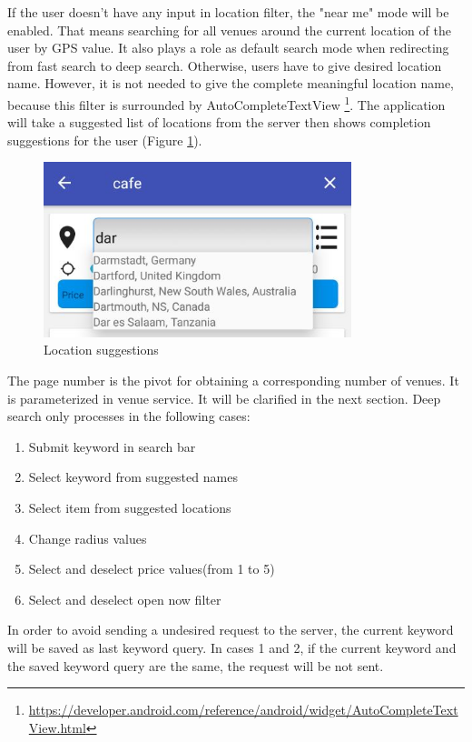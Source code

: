 If the user doesn't have any input in location filter, the "near me" mode will be enabled. That means searching for all venues around the current location of the user by GPS value. It also plays a role as default search mode when redirecting from fast search to deep search. Otherwise, users have to give desired location name. However, it is not needed to give the complete meaningful location name, because this filter is surrounded by AutoCompleteTextView \footnote{\url{https://developer.android.com/reference/android/widget/AutoCompleteTextView.html}}. The application will take a suggested list of locations from the server then shows completion suggestions for the user (Figure \ref{fig:locationSuggestions}).
\begin{figure}[htbp]
	\includegraphics[width=0.8\textwidth]{images/suggestedlocations.jpg}
	\centering
	\caption{Location suggestions}\label{fig:locationSuggestions}
\end{figure}
The page number is the pivot for obtaining a corresponding number of venues. It is parameterized in venue service. It will be clarified in the next section.
Deep search only processes in the following cases:
\begin{enumerate}
	\item Submit keyword in search bar
	\item Select keyword from suggested names
	\item Select item from suggested locations
	\item Change radius values
	\item Select and deselect price values(from 1 to 5)
	\item Select and deselect open now filter
\end{enumerate}
 
In order to avoid sending a undesired request to the server, the current keyword will be saved as last keyword query. In cases 1 and 2, if the current keyword and the saved keyword query are the same, the request will be not sent.

